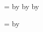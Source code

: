 \newcount\FirstAuthorPublications
{}

\newcount\StudentPublications
{}

\newcount\CoauthorPublications
{}

\newcount\CollaborativePublications
{}

\newcount\AllPublications
\AllPublications=\FirstAuthorPublications
\advance\AllPublications by \StudentPublications
\advance\AllPublications by \CoauthorPublications
\advance\AllPublications by \CollaborativePublications

\newcount\AllCollaborativePublications
\AllCollaborativePublications=\CoauthorPublications
\advance\AllCollaborativePublications by \CollaborativePublications
